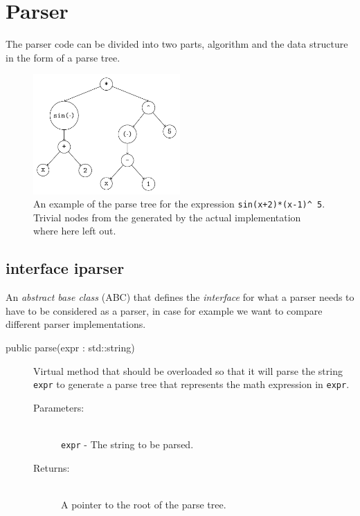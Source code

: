 \documentclass[a4paper,11pt]{kth-mag}
\begin{document}
\section{Parser}
The parser code can be divided into two parts, algorithm and the data structure in the form of a parse tree. 

\begin{figure}[ht]
\begin{center}
    \includegraphics[width=0.5\textwidth]{parse-tree.pdf}
    \caption{\small{
        An example of the parse tree for the
        expression \texttt{sin(x+2)*(x-1)}\texttt{\^~}\!\!\texttt{5}.
        Trivial nodes from the generated by the actual implementation where
        here left out.
    }}
   \label{fig:parsetree}
\end{center}
\end{figure}

\subsection{interface iparser}
An \emph{abstract base class} (ABC) that defines the \emph{interface} for what a parser 
needs to have to be considered as a parser, in case for example
we want to compare different parser implementations.
\begin{description}
    \item[public parse(expr : std::string)] Virtual method that should be
    overloaded so that it will parse the string \texttt{expr} to
    generate a parse tree that represents the math expression in \texttt{expr}.
    \begin{description}
        \item[Parameters:]~\\
            \verb+expr+ - The string to be parsed.
        \item[Returns:]~\\
            A pointer to the root of the parse tree.
    \end{description}
\end{description}
\end{document}
